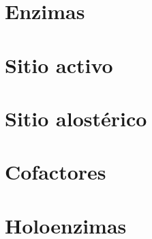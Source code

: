 

\section{Enzimas}



\section{Sitio activo}



\section{Sitio alostérico}



\section{Cofactores}



\section{Holoenzimas}





\newpage \putbib